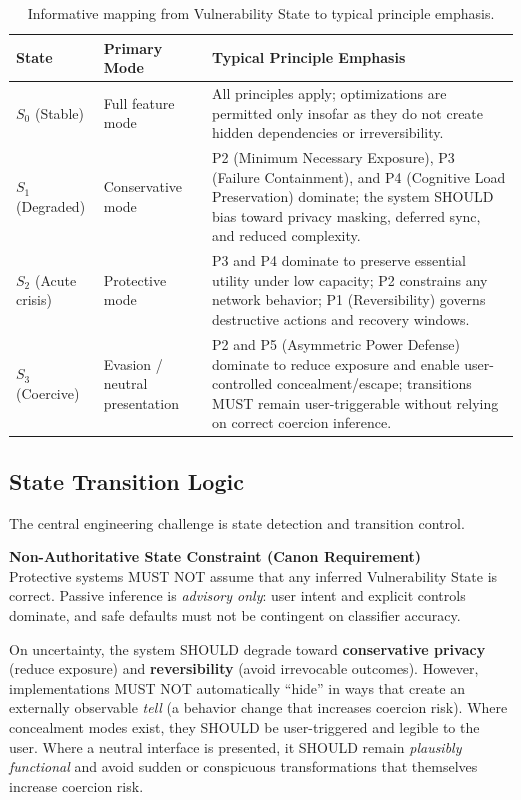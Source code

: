 \documentclass[12pt]{article}
\begin{document}
\begin{table}[h]
\centering
\begin{tabular}{@{}llp{5.7cm}@{}}
\toprule
State & Primary Mode & Typical Principle Emphasis \\
\midrule
$S_0$ (Stable) & Full feature mode & All principles apply; optimizations are permitted only insofar as they do not create hidden dependencies or irreversibility. \\
\midrule
$S_1$ (Degraded) & Conservative mode & P2 (Minimum Necessary Exposure), P3 (Failure Containment), and P4 (Cognitive Load Preservation) dominate; the system SHOULD bias toward privacy masking, deferred sync, and reduced complexity. \\
\midrule
$S_2$ (Acute crisis) & Protective mode & P3 and P4 dominate to preserve essential utility under low capacity; P2 constrains any network behavior; P1 (Reversibility) governs destructive actions and recovery windows. \\
\midrule
$S_3$ (Coercive) & Evasion / neutral presentation & P2 and P5 (Asymmetric Power Defense) dominate to reduce exposure and enable user-controlled concealment/escape; transitions MUST remain user-triggerable without relying on correct coercion inference. \\
\bottomrule
\end{tabular}
\caption{Informative mapping from Vulnerability State to typical principle emphasis.}
\label{tab:vsm-principles}
\end{table}

\subsection{State Transition Logic}
The central engineering challenge is state detection and transition control.

\textbf{Non-Authoritative State Constraint (Canon Requirement)}\\
Protective systems MUST NOT assume that any inferred Vulnerability State is correct. Passive inference is \emph{advisory only}: user intent and explicit controls dominate, and safe defaults must not be contingent on classifier accuracy.

On uncertainty, the system SHOULD degrade toward \textbf{conservative privacy} (reduce exposure) and \textbf{reversibility} (avoid irrevocable outcomes). However, implementations MUST NOT automatically ``hide'' in ways that create an externally observable \emph{tell} (a behavior change that increases coercion risk). Where concealment modes exist, they SHOULD be user-triggered and legible to the user.
Where a neutral interface is presented, it SHOULD remain \emph{plausibly functional} and avoid sudden or conspicuous transformations that themselves increase coercion risk.
\end{document}
